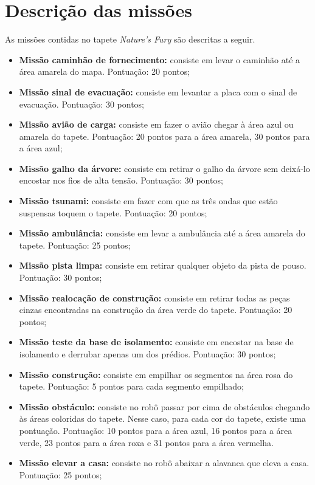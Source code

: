 \section{Descrição das missões}
As missões contidas no tapete \textit{Nature's Fury} \cite{challengeFury} são descritas a seguir.
\begin{itemize}
\item \textbf{Missão caminhão de fornecimento:} consiste em levar o caminhão até a área amarela do mapa. Pontuação: 20 pontos;
\item \textbf{Missão sinal de evacuação:} consiste em levantar a placa com o sinal de evacuação. Pontuação: 30 pontos;
\item \textbf{Missão avião de carga:} consiste em fazer o avião chegar à área azul ou amarela do tapete. Pontuação: 20 pontos para a área amarela, 30 pontos para a área azul;
\item \textbf{Missão galho da árvore:} consiste em retirar o galho da árvore sem deixá-lo encostar nos fios de alta tensão. Pontuação: 30 pontos;
\item \textbf{Missão tsunami:} consiste em fazer com que as três ondas que estão suspensas toquem o tapete. Pontuação: 20 pontos;
\item \textbf{Missão ambulância:} consiste em levar a ambulância até a área amarela do tapete. Pontuação: 25 pontos;
\item \textbf{Missão pista limpa:} consiste em retirar qualquer objeto da pista de pouso. Pontuação: 30 pontos;
\item \textbf{Missão realocação de construção:} consiste em retirar todas as peças cinzas encontradas na construção da área verde do tapete. Pontuação: 20 pontos;
\item \textbf{Missão teste da base de isolamento:} consiste em encostar na base de isolamento e derrubar apenas um dos prédios. Pontuação: 30 pontos;
\item \textbf{Missão construção:} consiste em empilhar os segmentos na área rosa do tapete. Pontuação: 5 pontos para cada segmento empilhado;
\item \textbf{Missão obstáculo:} consiste no robô passar por cima de obstáculos chegando às áreas coloridas do tapete. Nesse caso, para cada cor do tapete, existe uma pontuação. Pontuação: 10 pontos para a área azul, 16 pontos para a área verde, 23 pontos para a área roxa e 31 pontos para a área vermelha.
\item \textbf{Missão elevar a casa:} consiste no robô abaixar a alavanca que eleva a casa. Pontuação: 25 pontos;

\end{itemize}

